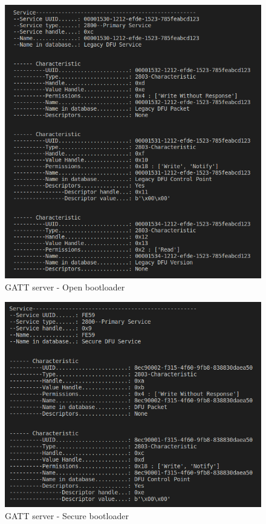 \documentclass{article}
\theoremstyle{plain}
\theoremstyle{definition}
\numberwithin{equation}{section}
\begin{document}
\begin{figure}[H]
	\centering
	\includegraphics[width=0.7\linewidth]{images/gatt-open}
	\caption{GATT server - Open bootloader}
	\label{fig:gatt-open}
\end{figure}

\begin{figure}[H]
	\centering
	\includegraphics[width=0.7\linewidth]{images/gatt-secure}
	\caption{GATT server - Secure bootloader}
	\label{fig:gatt-secure}
\end{figure}
\end{document}
